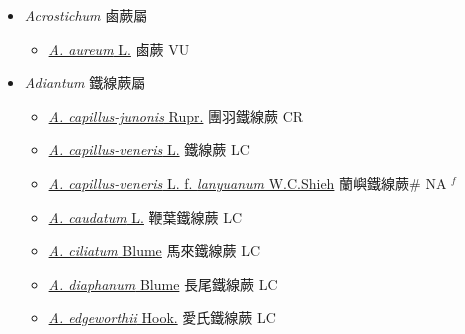 
  \begin{itemize}
 \item[] \textit{Acrostichum} 鹵蕨屬
                    
  \begin{itemize}
        \item[] \href{http://www.theplantlist.org/tpl1.1/search?q=Acrostichum+aureum}{\textit{A. aureum} L.}   鹵蕨 VU
  \end{itemize}
 \item[] \textit{Adiantum} 鐵線蕨屬
                    
  \begin{itemize}
        \item[] \href{http://www.theplantlist.org/tpl1.1/search?q=Adiantum+capillus-junonis}{\textit{A. capillus-junonis} Rupr.}   團羽鐵線蕨 CR
        \item[] \href{http://www.theplantlist.org/tpl1.1/search?q=Adiantum+capillus-veneris}{\textit{A. capillus-veneris} L.}   鐵線蕨 LC
        \item[] \href{http://www.theplantlist.org/tpl1.1/search?q=Adiantum+capillus-veneris+ f. +lanyuanum}{\textit{A. capillus-veneris} L.  f.  \textit{lanyuanum} W.C.Shieh}   蘭嶼鐵線蕨\# NA $^f$
        \item[] \href{http://www.theplantlist.org/tpl1.1/search?q=Adiantum+caudatum}{\textit{A. caudatum} L.}   鞭葉鐵線蕨 LC
        \item[] \href{http://www.theplantlist.org/tpl1.1/search?q=Adiantum+ciliatum}{\textit{A. ciliatum} Blume}     馬來鐵線蕨 LC
        \item[] \href{http://www.theplantlist.org/tpl1.1/search?q=Adiantum+diaphanum}{\textit{A. diaphanum} Blume}   長尾鐵線蕨 LC
        \item[] \href{http://www.theplantlist.org/tpl1.1/search?q=Adiantum+edgeworthii}{\textit{A. edgeworthii} Hook.}   愛氏鐵線蕨 LC

\end{itemize}
\end{itemize}
